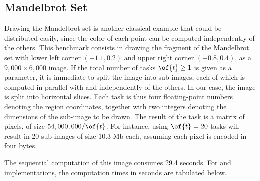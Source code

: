 \documentclass[tfpsymp,pagenumbers]{tfp07symp}
\newcommand{\Ocaml}{OCaml}
\begin{document}
\begin{comment}
  When master and worker programs are compiled with different versions
  of the \Ocaml\ compiler, our library still provides a monomorphic
  API over strings. As a consequence, we need to convert tasks and
  results to and from strings in both master and worker.  The modified
  worker program then looks as follows:
  \begin{ocaml}
    open Mono let worker (ai, bj) = ...  let worker_string s =
    string_of_coeff (worker (task_of_string s)) let () =
    Worker.compute worker_string ()
  \end{ocaml}
  The master program is modified in a similar way.  We simply replace
  \of{Poly} with \of{Mono} and encode/decode coefficients as strings,
  as follows:
  \begin{ocaml}
    let tasks = ... string_of_task ...  let master (_, (i,j)) r =
    c.(i).(j) <- coeff_of_string r; []
  \end{ocaml}
  where \of{string_of_task} and \of{task_of_string} are user-defined
  functions to convert tasks to and from strings.
\end{comment}

\subsection{Mandelbrot Set}

Drawing the Mandelbrot set is another classical example that could be
distributed easily, since the color of each point can be computed
independently of the others. 
This benchmark consists in drawing the fragment of the Mandelbrot set
with lower left corner $(-1.1, 0.2)$ and upper right corner $(-0.8,
0.4)$, as a $9,000\times6,000$ image. 
%
If the total number of tasks $\of{t} \ge 1$ is given as a
parameter,  it is immediate to split the image into  sub-images,
each of which is computed in parallel with and independently of the
others. In our case, the image is split into horizontal slices.
Each task is thus four floating-point numbers denoting the region
coordinates, together with two integers denoting the dimensions of the
sub-image to be drawn. The result of the task is a matrix of pixels,
of size $54,000,000 / \of{t}$. 
For instance, using $\of{t}=20$ tasks will
result in 20 sub-images of size $10.3$ Mb each,
assuming each pixel is encoded in four bytes.

The sequential computation of
this image consumes 29.4 seconds. For  and 
implementations, the computation times in seconds are tabulated below.
\end{document}
